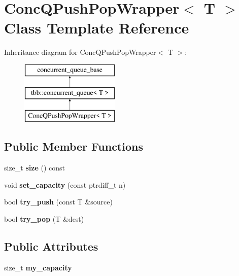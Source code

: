 \hypertarget{classConcQPushPopWrapper}{}\section{Conc\+Q\+Push\+Pop\+Wrapper$<$ T $>$ Class Template Reference}
\label{classConcQPushPopWrapper}
Inheritance diagram for Conc\+Q\+Push\+Pop\+Wrapper$<$ T $>$\+:\begin{figure}[H]
\begin{center}
\leavevmode
\includegraphics[height=3.000000cm]{classConcQPushPopWrapper}
\end{center}
\end{figure}
\subsection*{Public Member Functions}
\begin{DoxyCompactItemize}
\item 
\hypertarget{classConcQPushPopWrapper_a1f53f706a7632669debe9642102cdef0}{}size\+\_\+t {\bfseries size} () const \label{classConcQPushPopWrapper_a1f53f706a7632669debe9642102cdef0}

\item 
\hypertarget{classConcQPushPopWrapper_acbe27db89b1173d24ec22225dd75b875}{}void {\bfseries set\+\_\+capacity} (const ptrdiff\+\_\+t n)\label{classConcQPushPopWrapper_acbe27db89b1173d24ec22225dd75b875}

\item 
\hypertarget{classConcQPushPopWrapper_a6d2bd544140b1713892302433a815caa}{}bool {\bfseries try\+\_\+push} (const T \&source)\label{classConcQPushPopWrapper_a6d2bd544140b1713892302433a815caa}

\item 
\hypertarget{classConcQPushPopWrapper_aca2fd187204d54fd72e780c0301503e8}{}bool {\bfseries try\+\_\+pop} (T \&dest)\label{classConcQPushPopWrapper_aca2fd187204d54fd72e780c0301503e8}

\end{DoxyCompactItemize}
\subsection*{Public Attributes}
\begin{DoxyCompactItemize}
\item 
\hypertarget{classConcQPushPopWrapper_adb2af240e44ec52c222ea5b24a4e76ce}{}size\+\_\+t {\bfseries my\+\_\+capacity}\label{classConcQPushPopWrapper_adb2af240e44ec52c222ea5b24a4e76ce}

\end{DoxyCompactItemize}

